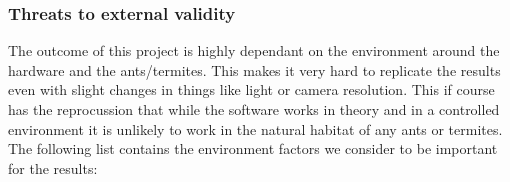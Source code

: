 \subsubsection{Threats to external validity}

The outcome of this project is highly dependant on the environment around the hardware and the ants/termites. This makes it very hard to replicate the results even with slight changes in things like light or camera resolution. This if course has the reprocussion that while the software works in theory and in a controlled environment it is unlikely to work in the natural habitat of any ants or termites. The following list contains the environment factors we consider to be important for the results:

